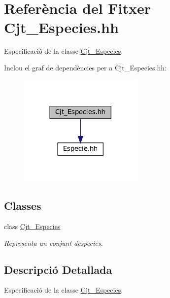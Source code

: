 \hypertarget{_cjt___especies_8hh}{}\section{Referència del Fitxer Cjt\+\_\+\+Especies.\+hh}
\label{_cjt___especies_8hh}


Especificació de la classe \hyperlink{class_cjt___especies}{Cjt\+\_\+\+Especies}.  


Inclou el graf de dependències per a Cjt\+\_\+\+Especies.\+hh\+:
\nopagebreak
\begin{figure}[H]
\begin{center}
\leavevmode
\includegraphics[width=173pt]{_cjt___especies_8hh__incl}
\end{center}
\end{figure}
\subsection*{Classes}
\begin{DoxyCompactItemize}
\item 
class \hyperlink{class_cjt___especies}{Cjt\+\_\+\+Especies}
\begin{DoxyCompactList}\small\item\em Representa un conjunt d\textquotesingle{}espècies. \end{DoxyCompactList}\end{DoxyCompactItemize}


\subsection{Descripció Detallada}
Especificació de la classe \hyperlink{class_cjt___especies}{Cjt\+\_\+\+Especies}. 

